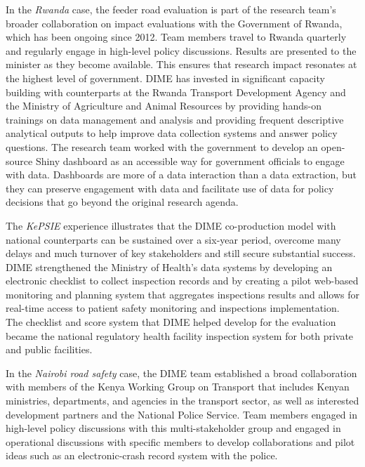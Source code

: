 In the \emph{Rwanda} case, the feeder road evaluation is part of the research team's broader collaboration on impact evaluations with the Government of Rwanda, which has been ongoing since 2012. Team members travel to Rwanda quarterly and regularly engage in high-level policy discussions. Results are presented to the minister as they become available. This ensures that research impact resonates at the highest level of government. DIME has invested in significant capacity building with counterparts at the Rwanda Transport Development Agency and the Ministry of Agriculture and Animal Resources by providing hands-on trainings on data management and analysis and providing frequent descriptive analytical outputs to help improve data collection systems and answer policy questions. The research team worked with the government to develop an open-source Shiny dashboard as an accessible way for government officials to engage with data. Dashboards are more of a data interaction than a data extraction, but they can preserve engagement with data and facilitate use of data for policy decisions that go beyond the original research agenda.

The \emph{KePSIE} experience illustrates that the DIME co-production model with national counterparts can be sustained over a six-year period, overcome many delays and much turnover of key stakeholders and still secure substantial success. DIME strengthened the Ministry of Health's data systems by developing an electronic checklist to collect inspection records and by creating a pilot web-based monitoring and planning system that aggregates inspections results and allows for real-time access to patient safety monitoring and inspections implementation. The checklist and score system that DIME helped develop for the evaluation became the national regulatory health facility inspection system for both private and public facilities.

In the \emph{Nairobi road safety} case, the DIME team established a broad collaboration with members of the Kenya Working Group on Transport that includes Kenyan ministries, departments, and agencies in the transport sector, as well as interested development partners and the National Police Service. Team members engaged in high-level policy discussions with this multi-stakeholder group and engaged in operational discussions with specific members to develop collaborations and pilot ideas such as an electronic-crash record system with the police.

